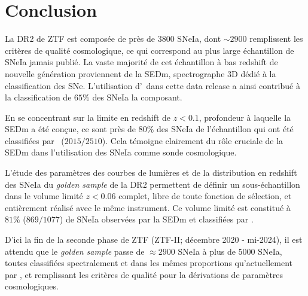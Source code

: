 \documentclass[../main/main.tex]{subfiles}
\begin{document}
\clearpage
\section*{Conclusion}

La DR2 de ZTF est composée de près de $3800$ SNeIa, dont $\sim2900$
remplissent les critères de qualité cosmologique, ce qui correspond au
plus large échantillon de SNeIa jamais publié. La vaste majorité de
cet échantillon à bas redshift de nouvelle génération proviennent de la
SEDm, spectrographe 3D dédié à la classification des SNe. L'utilisation
d'\hypergal\ dans cette data release a ainsi contribué à la
classification de $65\%$ des SNeIa la composant.

En se concentrant sur la limite en redshift de $z<0.1$, profondeur à
laquelle la SEDm a été conçue, ce sont près de $80\%$ des SNeIa de l'échantillon
qui ont été classifiées par \hypergal\ ($2015/2510$). Cela témoigne clairement du rôle
cruciale de la SEDm dans l'utilisation des SNeIa comme sonde cosmologique.

L'étude des paramètres des courbes de lumières et de la distribution en
redshift des SNeIa du \textit{golden sample} de la DR2 permettent de
définir un sous-échantillon dans le volume limité $z<0.06$
complet, libre de toute fonction de sélection, et entièrement réalisé
avec le même instrument. Ce volume limité est constitué à $81\%$
($869/1077$) de SNeIa observées par la SEDm et classifiées par
\hypergal.

D'ici la fin de la seconde phase de ZTF (ZTF-II; décembre 2020 -
mi-2024), il est attendu que le \textit{golden sample} passe de
$\approx2900$ SNeIa à plus de $5000$ SNeIa, toutes classifiées
spectralement et dans les mêmes proportions qu'actuellement par \hypergal, et
remplissant les critères de qualité pour la dérivations de paramètres cosmologiques.


%
%
\end{document}
